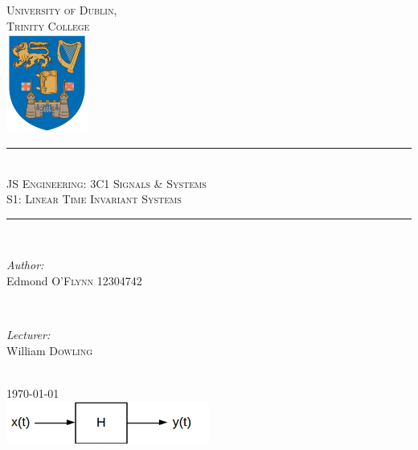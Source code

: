 \documentclass[12pt]{article}
\begin{document}
\begin{titlepage}

\newcommand{\HRule}{\rule{\linewidth}{0.5mm}}

\center
\textsc{\LARGE University of Dublin,\\Trinity College}\\[1.0cm]
\includegraphics[width=0.2\textwidth]{logo.png}

\HRule \\[0.4cm]
\textsc{\Large JS Engineering: 3C1 Signals \& Systems}\\[0.25cm]
\textsc{\large S1: Linear Time Invariant Systems}\\[0.1cm]
\HRule \\[0.4cm]
 
\begin{minipage}{0.5\textwidth}
\begin{flushleft} \large
\emph{Author:}
\\Edmond \textsc{O'Flynn} 12304742
\end{flushleft}
\end{minipage}
~
\begin{minipage}{0.4\textwidth}
\begin{flushleft} 
\large
\emph{Lecturer:} \\
William \textsc{Dowling} 
\end{flushleft}
\end{minipage}\\[6cm]

{\large \today}\\[2cm] 

\includegraphics[width=0.5\textwidth]{lti.png}
\clearpage
\end{titlepage}

\tableofcontents
{}
\thispagestyle{empty}
\cleardoublepage
\setcounter{page}{1}
\end{document}
